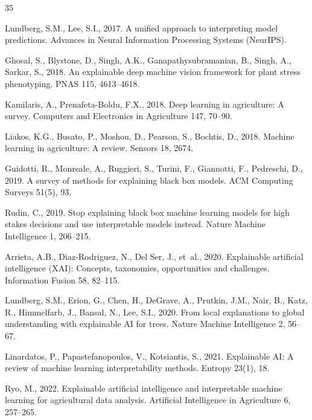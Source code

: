 \documentclass[3p,twocolumn,authoryear]{elsarticle}
\begin{document}
\begin{thebibliography}{35}
{
Lundberg, S.M., Lee, S.I., 2017.
A unified approach to interpreting model predictions.
Advances in Neural Information Processing Systems (NeurIPS).

Ghosal, S., Blystone, D., Singh, A.K., Ganapathysubramanian, B.,
  Singh, A., Sarkar, S., 2018.
An explainable deep machine vision framework for plant stress phenotyping.
PNAS 115, 4613--4618.

Kamilaris, A., Prenafeta-Boldu, F.X., 2018.
Deep learning in agriculture: A survey.
Computers and Electronics in Agriculture 147, 70--90.

Liakos, K.G., Busato, P., Moshou, D., Pearson, S., Bochtis, D., 2018.
Machine learning in agriculture: A review.
Sensors 18, 2674.

Guidotti, R., Monreale, A., Ruggieri, S., Turini, F., Giannotti, F.,
  Pedreschi, D., 2019.
A survey of methods for explaining black box models.
ACM Computing Surveys 51(5), 93.

Rudin, C., 2019.
Stop explaining black box machine learning models for high stakes decisions and use interpretable models instead.
Nature Machine Intelligence 1, 206--215.

Arrieta, A.B., Diaz-Rodriguez, N., Del Ser, J., et~al., 2020.
Explainable artificial intelligence (XAI): Concepts, taxonomies, opportunities and challenges.
Information Fusion 58, 82--115.

Lundberg, S.M., Erion, G., Chen, H., DeGrave, A., Prutkin, J.M.,
  Nair, B., Katz, R., Himmelfarb, J., Bansal, N., Lee, S.I., 2020.
From local explanations to global understanding with explainable AI for trees.
Nature Machine Intelligence 2, 56--67.

Linardatos, P., Papastefanopoulos, V., Kotsiantis, S., 2021.
Explainable AI: A review of machine learning interpretability methods.
Entropy 23(1), 18.

Ryo, M., 2022.
Explainable artificial intelligence and interpretable machine learning for agricultural data analysis.
Artificial Intelligence in Agriculture 6, 257--265.

}
\end{thebibliography}
\end{document}
